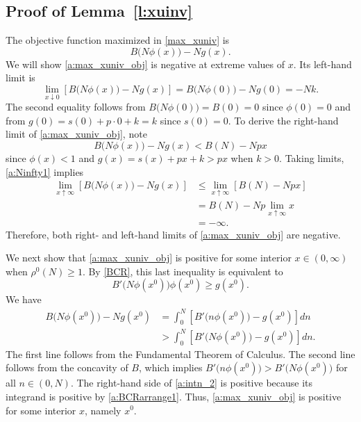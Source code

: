 \documentclass[12pt]{article}
\newcommand{\efficacy}{\phi}
\newcommand{\benefit}{B}
\newcommand{\ratio}{\rho^0\!}
\newcommand{\xno}{x^{0}}
\begin{document}

\subsection*{Proof of Lemma~\ref{l:xuinv}}

The objective function maximized in \eqref{max_xuniv} is
\begin{equation}
\label{a:max_xuniv_obj}
\benefit \bigl( N\efficacy(x) \bigr) - N g(x).
\end{equation}
We will show \eqref{a:max_xuniv_obj} is negative at extreme values of
$x$. Its left-hand limit is
\begin{equation}
 \label{a:N0limit}
\lim_{x \downarrow 0} \left[ \benefit \bigl( N\efficacy(x) \bigr) - N
  g(x) \right] = \benefit \bigl( N\efficacy(0) \bigr) - N g(0) = -Nk.
\end{equation}
The second equality follows from $\benefit \bigl( N \efficacy(0)
\bigr) = \benefit(0) = 0$ since $\efficacy(0) = 0$ and from $g(0) =
s(0) + p \cdot 0 + k = k$ since $s(0) = 0$. To derive the right-hand
limit of \eqref{a:max_xuniv_obj}, note
\begin{equation}
\label{a:Ninfty1}
\benefit \bigl( N \efficacy(x) \bigr) - N g(x) < \benefit(N) - Npx
\end{equation}
since $\efficacy(x) < 1$ and $g(x) = s(x) + px + k > px$ when $k >
0$. Taking limits, \eqref{a:Ninfty1} implies
\begin{align}
\lim_{x \uparrow \infty} \left[ \benefit \bigl( N\efficacy(x) \bigr) - N g(x) \right] & \leq \lim_{x \uparrow \infty} \left[ \benefit(N) - Npx \right] \label{a:Ninfty2} \\
& = \benefit(N) - Np \lim_{x \uparrow \infty} x \label{a:Ninfty3} \\
& = - \infty. \label{a:Ninfty4}
\end{align}
Therefore, both right- and left-hand limits of \eqref{a:max_xuniv_obj}
are negative.

We next show that \eqref{a:max_xuniv_obj} is positive for some
interior $x \in (0, \infty)$ when $\ratio(N) \geq 1$. By \eqref{BCR},
this last inequality is equivalent to
\begin{equation}
\label{a:BCRarrange1}
\benefit' \! \bigl( N \efficacy(\xno) \bigr) \efficacy(\xno) \geq g(\xno).
\end{equation}
We have
\begin{align}
\benefit \bigl( N \efficacy(\xno) \bigr) - N g(\xno) & = \int_0^N \left[ \benefit' \! \bigl( n \efficacy(\xno) \bigr) - g(\xno) \right] dn \label{a:intn_1} \\
& >  \int_0^N \left[ \benefit'\! \bigl( N \efficacy(\xno) \bigr) - g(\xno) \right] dn. \label{a:intn_2} 
\end{align}
The first line follows from the Fundamental Theorem of Calculus. The
second line follows from the concavity of $\benefit$, which implies
$\benefit' \! \bigl( n \efficacy(\xno) \bigr) > \benefit' \! \bigl( N
\efficacy(\xno) \bigr)$ for all $n \in (0, N)$. The right-hand side of
\eqref{a:intn_2} is positive because its integrand is positive by
\eqref{a:BCRarrange1}. Thus, \eqref{a:max_xuniv_obj} is positive for
some interior $x$, namely $\xno$.
\end{document}
